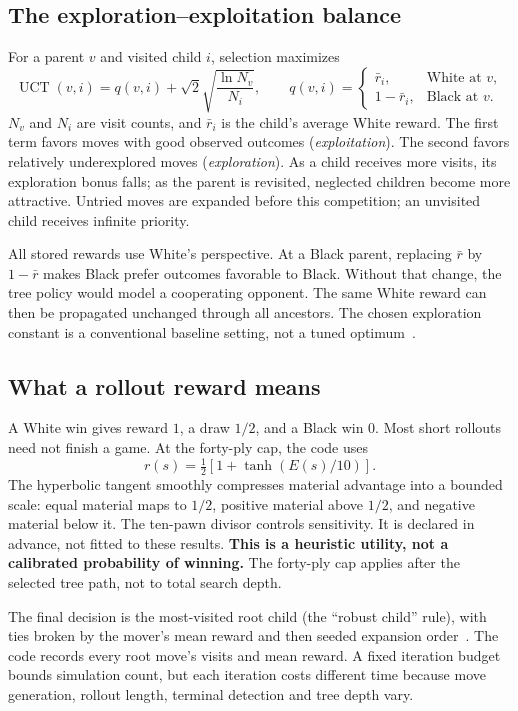 \documentclass[10pt,letterpaper]{article}
\begin{document}
\subsection{The exploration--exploitation balance}
For a parent $v$ and visited child $i$, selection maximizes
\[
\operatorname{UCT}(v,i)=q(v,i)+\sqrt{2}\sqrt{\frac{\ln N_v}{N_i}},\qquad
q(v,i)=\begin{cases}\bar r_i,&\text{White at }v,\\1-\bar r_i,&\text{Black at }v.\end{cases}
\]
$N_v$ and $N_i$ are visit counts, and $\bar r_i$ is the child's average White reward. The first term favors moves with good observed outcomes (\emph{exploitation}). The second favors relatively underexplored moves (\emph{exploration}). As a child receives more visits, its exploration bonus falls; as the parent is revisited, neglected children become more attractive. Untried moves are expanded before this competition; an unvisited child receives infinite priority.

All stored rewards use White's perspective. At a Black parent, replacing $\bar r$ by $1-\bar r$ makes Black prefer outcomes favorable to Black. Without that change, the tree policy would model a cooperating opponent. The same White reward can then be propagated unchanged through all ancestors. The chosen exploration constant is a conventional baseline setting, not a tuned optimum~\cite{kocsis2006}.

\subsection{What a rollout reward means}
A White win gives reward $1$, a draw $1/2$, and a Black win $0$. Most short rollouts need not finish a game. At the forty-ply cap, the code uses
\[
r(s)=\tfrac12\left[1+\tanh\left(E(s)/10\right)\right].
\]
The hyperbolic tangent smoothly compresses material advantage into a bounded scale: equal material maps to $1/2$, positive material above $1/2$, and negative material below it. The ten-pawn divisor controls sensitivity. It is declared in advance, not fitted to these results. \textbf{This is a heuristic utility, not a calibrated probability of winning.} The forty-ply cap applies after the selected tree path, not to total search depth.

The final decision is the most-visited root child (the ``robust child'' rule), with ties broken by the mover's mean reward and then seeded expansion order~\cite{browne2012}. The code records every root move's visits and mean reward. A fixed iteration budget bounds simulation count, but each iteration costs different time because move generation, rollout length, terminal detection and tree depth vary.
\end{document}
